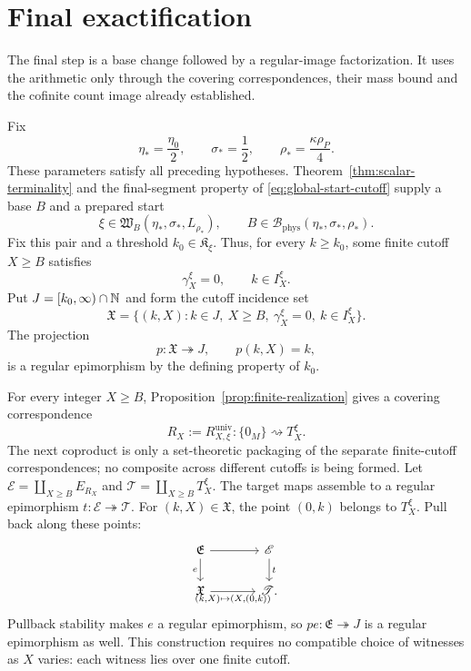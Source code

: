 \section{Final exactification}
\label{sec:terminalization}

The final step is a base change followed by a regular-image factorization.  It uses the arithmetic only through the covering correspondences, their mass bound and the cofinite count image already established.

Fix
\[
\eta_*=\frac{\eta_0}{2},\qquad
\sigma_*=\frac12,\qquad
\rho_*=\frac{\kappa\rho_P}{4}.
\]
These parameters satisfy all preceding hypotheses.  Theorem~\ref{thm:scalar-terminality} and the final-segment property of \eqref{eq:global-start-cutoff} supply a base $B$ and a prepared start
\[
\xi\in\mathfrak W_B(\eta_*,\sigma_*,L_{\rho_*}),
\qquad B\in\mathcal B_{\mathrm{phys}}(\eta_*,\sigma_*,\rho_*).
\]
Fix this pair and a threshold $k_0\in\mathfrak K_\xi$.  Thus, for every $k\ge k_0$, some finite cutoff $X\ge B$ satisfies
\[
\gamma_X^\xi=0,\qquad k\in I_X^\xi.
\]
Put $J=[k_0,\infty)\cap\mathbb N$ and form the cutoff incidence set
\begin{equation}\label{eq:universal-cutoff-incidence}
\mathfrak X=
\{(k,X):k\in J,\ X\ge B,\ \gamma_X^\xi=0,\ k\in I_X^\xi\}.
\end{equation}
The projection
\begin{equation}\label{eq:cutoff-count-regular-epi}
p:\mathfrak X\twoheadrightarrow J,\qquad p(k,X)=k,
\end{equation}
is a regular epimorphism by the defining property of $k_0$.

For every integer $X\ge B$, Proposition~\ref{prop:finite-realization} gives a covering correspondence
\[
R_X:=R_{X,\xi}^{\mathrm{univ}}:\{0_M\}\rightsquigarrow T_X^\xi.
\]
The next coproduct is only a set-theoretic packaging of the separate finite-cutoff correspondences; no composite across different cutoffs is being formed.  Let $\mathscr E=\coprod_{X\ge B}E_{R_X}$ and $\mathscr T=\coprod_{X\ge B}T_X^\xi$.  The target maps assemble to a regular epimorphism $t:\mathscr E\twoheadrightarrow\mathscr T$.  For $(k,X)\in\mathfrak X$, the point $(0,k)$ belongs to $T_X^\xi$.  Pull back along these points:
\begin{equation}\label{eq:terminal-edge-pullback}
\begin{tikzcd}[column sep=large]
\mathfrak E \arrow[r] \arrow[d,"{e}"'] & \mathscr E \arrow[d,"{t}"]\\
\mathfrak X \arrow[r,"{(k,X)\mapsto(X,(0,k))}"'] & \mathscr T.
\end{tikzcd}
\end{equation}
Pullback stability makes $e$ a regular epimorphism, so $pe:\mathfrak E\twoheadrightarrow J$ is a regular epimorphism as well.  This construction requires no compatible choice of witnesses as $X$ varies: each witness lies over one finite cutoff.

